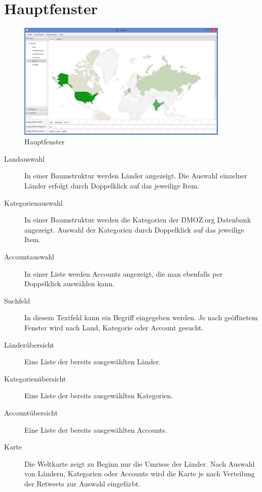 
\section{Hauptfenster}

\begin{figure}[h]
	\centering
	\includegraphics[width=0.9\textwidth]{img/DemoGUIMain.png}
	\caption{Hauptfenster}
	\label{c:Hauptfenster}
\end{figure}

\begin{description}
	\item[Landauswahl] In einer Baumstruktur werden Länder angezeigt. Die Auswahl einzelner Länder erfolgt durch Doppelklick auf das jeweilige Item.
	\item[Kategorienauswahl] In einer Baumstruktur werden die Kategorien der DMOZ.org Datenbank angezeigt. Auswahl der Kategorien durch Doppelklick auf das jeweilige Item.
	\item[Accountauswahl] In einer Liste werden Accounts angezeigt, die man ebenfalls per Doppelklick auswählen kann.
	\item[Suchfeld] In diesem Textfeld kann ein Begriff eingegeben werden. Je nach geöffnetem Fenster wird nach Land, Kategorie oder Account gesucht.
	\item[Länderübersicht] Eine Liste der bereits ausgewählten Länder.
	\item[Kategorienübersicht] Eine Liste der bereits ausgewählten Kategorien.
	\item[Accountübersicht] Eine Liste der bereits ausgewählten Accounts.
	\item[Karte] Die Weltkarte zeigt zu Beginn nur die Umrisse der Länder. Nach Auswahl von Ländern, Kategorien oder Accounts wird die Karte je nach Verteilung der Retweets zur Auswahl eingefärbt.	
\end{description}

